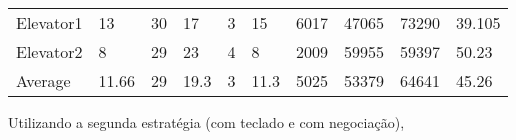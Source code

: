 ﻿\documentclass[a4paper]{article}
\begin{document}
\begin{table}[h]
\begin{tabular}{@{}llllllllll@{}}
Elevator1 & 13        & 30            &  17           & 3                                                               & 15                                                                  & 6017                                                         & 47065                                                 & 73290                                                   & 39.105         \\
Elevator2 & 8        & 29            & 23           & 4                                                               & 8                                                                  & 2009                                                         & 59955                                                 & 59397                                                   & 50.23         \\
Average   & 11.66     & 29         & 19.3        & 3                                                              & 11.3                                                            & 5025                                                         & 53379                                                 & 64641                                                   & 45.26         \\ \bottomrule
\end{tabular}
\end{table}

\newpage

Utilizando a segunda estratégia (com teclado e com negociação),
\end{document}
